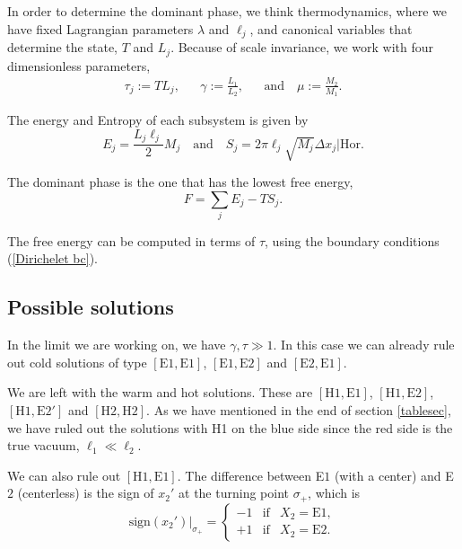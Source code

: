 In order to determine the dominant phase, we think thermodynamics, where we have fixed Lagrangian parameters $\lambda$ and $\ell_j$, and canonical variables that determine the state, $T$ and $L_j$. Because of scale invariance, we work with four dimensionless parameters,
\begin{align}
    \tau_j:=TL_j, && \gamma:= \frac{L_1}{L_2}, && \text{and} \quad \mu := \frac{M_2}{M_1}.
\end{align}

The energy and Entropy of each subsystem is given by
\begin{equation}
    E_j = \frac{L_j\ell_j}{2}M_j \quad \text{and} \quad S_j = 2\pi\ell_j\sqrt{M_j}\Delta x_j|\text{Hor}.
\end{equation}

The dominant phase is the one that has the lowest free energy,
\begin{equation}
    F = \sum_j E_j -T S_j.
\end{equation}

The free energy can be computed in terms of $\tau$, using the boundary conditions (\ref{Dirichelet bc}).

\subsection{Possible solutions}

In the limit we are working on, we have $\gamma,\tau \gg 1$. In this case we can already rule out cold solutions of type $\left[\text{E}1,\text{E}1\right]$, $\left[\text{E}1,\text{E}2\right]$ and $\left[\text{E}2,\text{E}1\right]$.
 
We are left with the warm and hot solutions. These are $\left[\text{H}1,\text{E}1\right]$, $\left[\text{H}1,\text{E}2\right]$, $\left[\text{H}1,\text{E}2'\right]$ and $\left[\text{H}2,\text{H}2\right]$. As we have mentioned in the end of section \ref{tablesec}, we have ruled out the solutions with H1 on the blue side since the red side is the true vacuum, $\ell_1\ll\ell_2$.
 
We can also rule out $\left[\text{H}1,\text{E}1\right]$. The difference between E$1$ (with a center) and E$2$ (centerless) is the sign of $x_2'$ at the turning point $\sigma_+$, which is
\begin{equation}
    \text{sign}(x_2')|_{\sigma_+} = 
    \left\{
    \begin{array}{lll}
        -1 & \mbox{if} & X_2=\text{E}1, \\
        +1 & \mbox{if} & X_2=\text{E}2.
    \end{array}
\right.
\end{equation}

